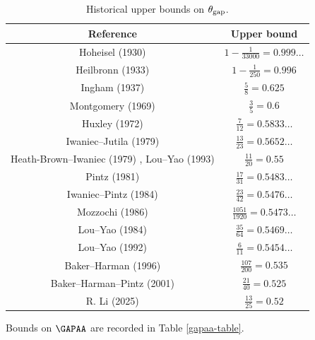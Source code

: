 \begin{table}[ht]
    \caption{Historical upper bounds on $\theta_{\mathrm{gap}}$.}
    \label{gapmax-table}
    \centering
    \renewcommand{\arraystretch}{1.2}
    \begin{tabular}{|c|c|}
    \hline
    Reference & Upper bound \\
    \hline
    Hoheisel (1930) \cite{hoheisel_1930} & $1 - \frac{1}{33000} = 0.999\dots$ \\
    \hline
    Heilbronn (1933) \cite{heilbronn_1933} & $1 - \frac{1}{250} = 0.996$ \\
    \hline
    Ingham (1937) \cite{ingham_difference_1937} & $\frac{5}{8} = 0.625$ \\
    \hline
    Montgomery (1969) \cite{montgomery_1969} & $\frac{3}{5} = 0.6$ \\
    \hline
    Huxley (1972) \cite{Huxley} & $\frac{7}{12} = 0.5833\dots$ \\
    \hline
    Iwaniec--Jutila (1979)\cite{iwaniec-jutila} & $\frac{13}{23} = 0.5652\dots$ \\
    \hline
    Heath-Brown--Iwaniec (1979) \cite{heathbrown_iwaniec_1979}, Lou--Yao (1993) \cite{lou_yao_number_1993}& $\frac{11}{20} = 0.55$ \\
    \hline
    Pintz (1981) \cite{pintz_1981} & $\frac{17}{31} = 0.5483\dots$ \\
    \hline
    Iwaniec--Pintz (1984) \cite{iwaniec-pintz} & $\frac{23}{42} = 0.5476\dots$\\
    \hline
    Mozzochi (1986) \cite{mozzochi-consecutive} & $\frac{1051}{1920} = 0.5473\dots$ \\
    \hline
    Lou--Yao (1984) \cite{LouYao3564} & $\frac{35}{64} = 0.5469\dots$\\
    \hline
    Lou--Yao (1992) \cite{lou-yao-chebychev} & $\frac{6}{11} = 0.5454\dots$\\
    \hline
    Baker--Harman (1996) \cite{baker-harman} & $\frac{107}{200} = 0.535$\\
    \hline
    Baker--Harman--Pintz (2001) \cite{baker-harman-pintz} & $\frac{21}{40} = 0.525$ \\
    \hline
    R. Li (2025) \cite{li_number_2025} & $\frac{13}{25} = 0.52$\\
    \hline
    \end{tabular}
    \end{table}

Bounds on $\GAPAA$ are recorded in Table \ref{gapaa-table}.


